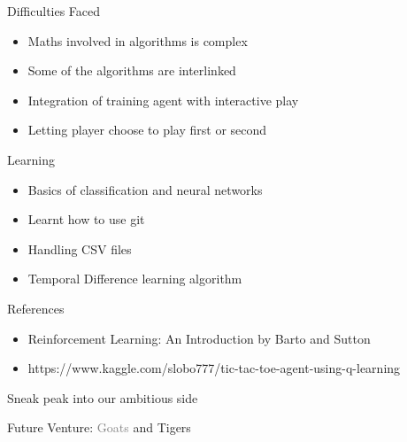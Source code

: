 \documentclass[14pt]{beamer}
\begin{document}
\begin{frame}{Difficulties Faced}
    \begin{itemize}
        \item Maths involved in algorithms is complex
        \item Some of the algorithms are interlinked
	\item Integration of training agent with interactive play
        \item Letting player choose to play first or second
    \end{itemize}
\end{frame}

\begin{frame}{Learning}
    \begin{itemize}
        \item Basics of classification and neural networks
        \item Learnt how to use git
        \item Handling CSV files
        \item Temporal Difference learning algorithm
    \end{itemize}
\end{frame}

\begin{frame}{References}
    \begin{itemize}
        \item Reinforcement Learning: An Introduction by Barto and Sutton
        \item https://www.kaggle.com/slobo777/tic-tac-toe-agent-using-q-learning
    \end{itemize}
\end{frame}

\begin{frame}{Sneak peak into our ambitious side}
    \begin{center}
        Future Venture: \textcolor{gray}{Goats} and \textcolor{myAmber}{Tigers}
    \end{center}
\end{frame}
\end{document}
